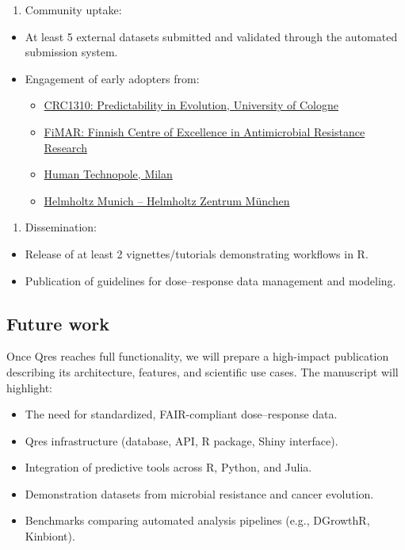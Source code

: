 \documentclass[
]{article}
\providecommand{\tightlist}{%
  \setlength{\itemsep}{0pt}\setlength{\parskip}{0pt}}
\begin{document}
\begin{enumerate}
\def\labelenumi{\arabic{enumi}.}
\setcounter{enumi}{1}
\tightlist
\item
  Community uptake:
\end{enumerate}

\begin{itemize}
\item
  At least 5 external datasets submitted and validated through the
  automated submission system.
\item
  Engagement of early adopters from:

  \begin{itemize}
  \tightlist
  \item
    \href{https://crc1310.uni-koeln.de/}{CRC1310: Predictability in
    Evolution, University of Cologne}
  \item
    \href{https://www.fimar.fi/}{FiMAR: Finnish Centre of Excellence in
    Antimicrobial Resistance Research}
  \item
    \href{https://humantechnopole.it/en/}{Human Technopole, Milan}
  \item
    \href{https://www.helmholtz-munich.de/en}{Helmholtz Munich --
    Helmholtz Zentrum München}
  \end{itemize}
\end{itemize}

\begin{enumerate}
\def\labelenumi{\arabic{enumi}.}
\setcounter{enumi}{2}
\tightlist
\item
  Dissemination:
\end{enumerate}

\begin{itemize}
\tightlist
\item
  Release of at least 2 vignettes/tutorials demonstrating workflows in
  R.
\item
  Publication of guidelines for dose--response data management and
  modeling.
\end{itemize}

\subsection{Future work}\label{future-work}

Once Qres reaches full functionality, we will prepare a high-impact
publication describing its architecture, features, and scientific use
cases. The manuscript will highlight:

\begin{itemize}
\tightlist
\item
  The need for standardized, FAIR-compliant dose--response data.
\item
  Qres infrastructure (database, API, R package, Shiny interface).
\item
  Integration of predictive tools across R, Python, and Julia.
\item
  Demonstration datasets from microbial resistance and cancer evolution.
\item
  Benchmarks comparing automated analysis pipelines (e.g., DGrowthR,
  Kinbiont).
\end{itemize}
\end{document}
